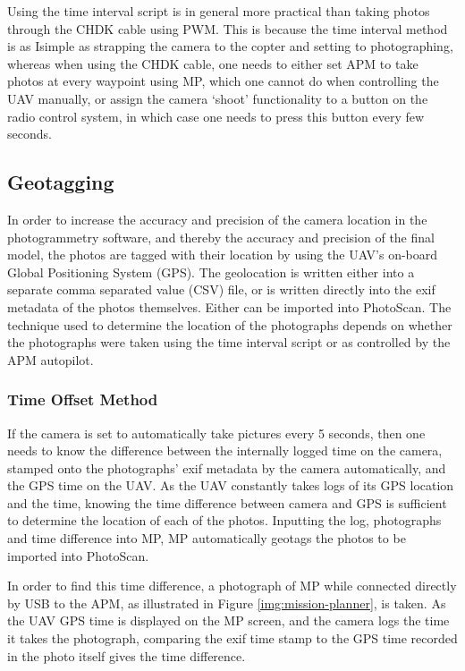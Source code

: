 Using the time interval script is in general more practical than taking photos
through the CHDK cable using PWM. This is because the time interval method is as
Isimple as strapping the camera to the copter and setting to photographing,
whereas when using the CHDK cable, one needs to either set APM to take photos at
every waypoint using MP, which one cannot do when controlling the UAV manually,
or assign the camera `shoot' functionality to a button on the radio control
system, in which case one needs to press this button every few seconds.

\subsection{Geotagging}
\label{sec:methods/geotagging}

In order to increase the accuracy and precision of the camera location in the
photogrammetry software, and thereby the accuracy and precision of the final
model, the photos are tagged with their location by using the UAV's on-board
Global Positioning System (GPS). The geolocation is written either into a
separate comma separated value (CSV) file, or is written directly into the exif
metadata of the photos themselves. Either can be imported into PhotoScan. The
technique used to determine the location of the photographs depends on whether
the photographs were taken using the time interval script or as controlled by
the APM autopilot.

\subsubsection{Time Offset Method}

If the camera is set to automatically take pictures every 5 seconds, then one
needs to know the difference between the internally logged time on the camera,
stamped onto the photographs' exif metadata by the camera automatically, and the
GPS time on the UAV. As the UAV constantly takes logs of its GPS location and
the time, knowing the time difference between camera and GPS is sufficient to
determine the location of each of the photos. Inputting the log, photographs and
time difference into MP, MP automatically geotags the photos to be imported into
PhotoScan.

In order to find this time difference, a photograph of MP while connected
directly by USB to the APM, as illustrated in Figure \ref{img:mission-planner},
is taken. As the UAV GPS time is displayed on the MP screen, and the camera logs
the time it takes the photograph, comparing the exif time stamp to the GPS time
recorded in the photo itself gives the time difference.

